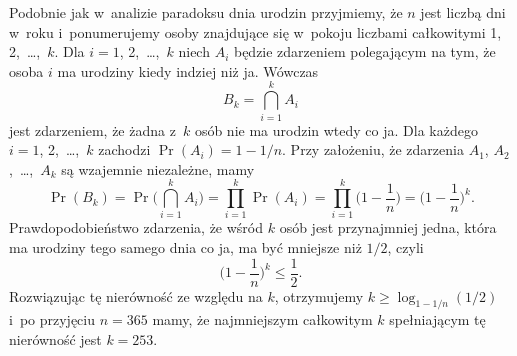 % 


\exercise %
Podobnie jak w~analizie paradoksu dnia urodzin przyjmiemy, że $n$ jest liczbą dni w~roku i~ponumerujemy osoby znajdujące się w~pokoju liczbami całkowitymi 1, 2,~\dots,~$k$. Dla $i=1$, 2,~\dots,~$k$ niech $A_i$ będzie zdarzeniem polegającym na tym, że osoba $i$ ma urodziny kiedy indziej niż ja. Wówczas
\[
	B_k = \bigcap_{i=1}^kA_i
\]
jest zdarzeniem, że żadna z~$k$ osób nie ma urodzin wtedy co ja. Dla każdego $i=1$, 2,~\dots,~$k$ zachodzi $\Pr(A_i)=1-1/n$. Przy założeniu, że zdarzenia $A_1$, $A_2$,~\dots,~$A_k$ są wzajemnie niezależne, mamy
\[
	\Pr(B_k) = \Pr\biggl(\bigcap_{i=1}^kA_i\biggr) = \prod_{i=1}^k\Pr(A_i) = \prod_{i=1}^k\biggl(1-\frac{1}{n}\biggr) = \biggl(1-\frac{1}{n}\biggr)^k.
\]
Prawdopodobieństwo zdarzenia, że wśród $k$ osób jest przynajmniej jedna, która ma urodziny tego samego dnia co ja, ma być mniejsze niż $1/2$, czyli
\[
	\biggl(1-\frac{1}{n}\biggr)^k \le \frac{1}{2}.
\]
Rozwiązując tę nierówność ze względu na $k$, otrzymujemy $k\ge\log_{1-1/n}(1/2)$ i~po przyjęciu $n=365$ mamy, że najmniejszym całkowitym $k$ spełniającym tę nierówność jest $k=253$.

